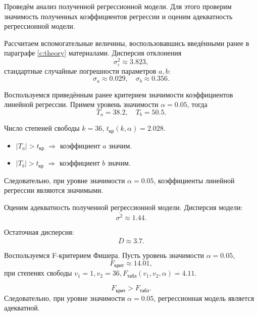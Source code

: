 Проведём анализ полученной регрессионной модели. Для этого проверим значимость полученных коэффициентов регрессии и оценим адекватность регрессионной модели.

Рассчитаем вспомогательные величины, воспользовавшись введёнными ранее в параграфе \ref{c:theory} материалами. Дисперсия отклонения
\begin{equation*}
	\sigma_{\varepsilon}^2 \approx 3.823,
\end{equation*}
стандартные случайные погрешности параметров $a, b$:
\begin{equation*}
	\sigma_{a} \approx 0.029, \quad \sigma_{b} \approx 0.356.
\end{equation*}

Воспользуемся приведённым ранее критерием значимости коэффициентов линейной регрессии. Примем уровень значимости $\alpha = 0.05$, тогда
\begin{equation*}
	T_{a} = 38.2, \quad T_{b} = 50.5.
\end{equation*}

Число степеней свободы $k = 36$, $t_{\textrm{кр}}(k, \alpha) = 2.028$.

\begin{itemize}
	\item $\vert T_{a} \vert > t_{\textrm{кр}}$ $\Rightarrow$ коэффициент $a$ значим.
	\item $\vert T_{b} \vert > t_{\textrm{кр}}$ $\Rightarrow$ коэффициент $b$ значим.
\end{itemize}
Следовательно, при уровне значимости $\alpha = 0.05$, коэффициенты линейной регрессии являются значимыми.

Оценим адекватность полученной регрессионной модели. Дисперсия модели:
\begin{equation*}
	\overline{\sigma^2} \approx 1.44.
\end{equation*}

Остаточная дисперсия:
\begin{equation*}
	\overline{D} \approx 3.7.
\end{equation*}

Воспользуемся F-критерием Фишера. Пусть уровень значимости $\alpha = 0.05$,
\begin{equation*}
	F_{\textrm{крит}} \approx 14.01,
\end{equation*}
при степенях свободы $v_1 = 1, v_2 = 36, F_{\textrm{табл}}(v_1, v_2, \alpha) = 4.11$.

\begin{equation*}
	F_{\textrm{крит}} > F_{\textrm{табл}}.
\end{equation*}
Следовательно, при уровне значимости $\alpha = 0.05$, регрессионная модель является адекватной.

